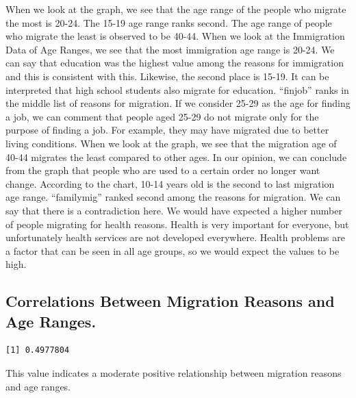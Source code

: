 \documentclass[
  11pt,
  a4paper,
  DIV=11,
  numbers=noendperiod]{scrartcl}
\newenvironment{Shaded}{\begin{snugshade}}{\end{snugshade}}
\newcommand{\FunctionTok}[1]{\textcolor[rgb]{0.28,0.35,0.67}{#1}}
\newcommand{\NormalTok}[1]{\textcolor[rgb]{0.00,0.23,0.31}{#1}}
\newcommand{\SpecialCharTok}[1]{\textcolor[rgb]{0.37,0.37,0.37}{#1}}
\begin{document}
When we look at the graph, we see that the age range of the people who
migrate the most is 20-24. The 15-19 age range ranks second. The age
range of people who migrate the least is observed to be 40-44. When we
look at the Immigration Data of Age Ranges, we see that the most
immigration age range is 20-24. We can say that education was the
highest value among the reasons for immigration and this is consistent
with this. Likewise, the second place is 15-19. It can be interpreted
that high school students also migrate for education. ``finjob'' ranks
in the middle list of reasons for migration. If we consider 25-29 as the
age for finding a job, we can comment that people aged 25-29 do not
migrate only for the purpose of finding a job. For example, they may
have migrated due to better living conditions. When we look at the
graph, we see that the migration age of 40-44 migrates the least
compared to other ages. In our opinion, we can conclude from the graph
that people who are used to a certain order no longer want change.
According to the chart, 10-14 years old is the second to last migration
age range. ``familymig'' ranked second among the reasons for migration.
We can say that there is a contradiction here. We would have expected a
higher number of people migrating for health reasons. Health is very
important for everyone, but unfortunately health services are not
developed everywhere. Health problems are a factor that can be seen in
all age groups, so we would expect the values to be high.

\hypertarget{correlations-between-migration-reasons-and-age-ranges.}{%
\subsection{Correlations Between Migration Reasons and Age
Ranges.}\label{correlations-between-migration-reasons-and-age-ranges.}}

\begin{Shaded}
\end{Shaded}

\begin{verbatim}
[1] 0.4977804
\end{verbatim}

This value indicates a moderate positive relationship between migration
reasons and age ranges.
\end{document}
